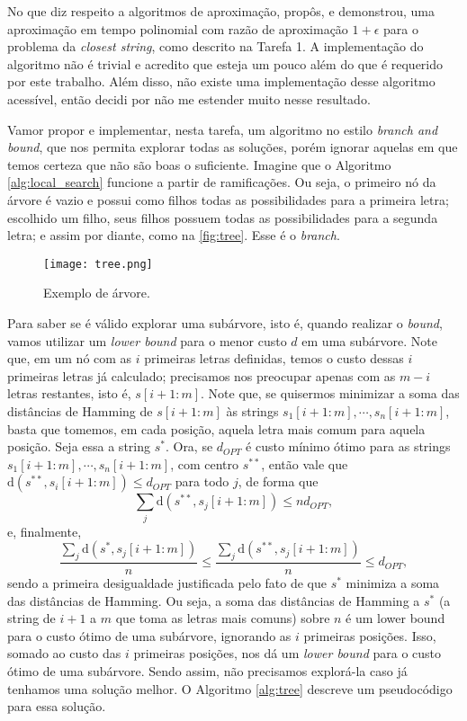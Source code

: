 No que diz respeito a algoritmos de aproximação, \cite{li2002closest} propôs, e demonstrou, uma aproximação em tempo polinomial com razão de aproximação $1 + \epsilon$ para o problema da \textit{closest string}, como descrito na Tarefa 1.
A implementação do algoritmo não é trivial e acredito que esteja um pouco além do que é requerido por este trabalho. Além disso, não existe uma implementação desse algoritmo acessível, então decidi por não me estender muito nesse resultado.

Vamor propor e implementar, nesta tarefa, um algoritmo no estilo \textit{branch and bound}, que nos permita explorar todas as soluções, porém ignorar aquelas em que temos certeza que não são boas o suficiente. Imagine que o Algoritmo \ref{alg:local_search} funcione a partir de ramificações. Ou seja, o primeiro nó da árvore é vazio e possui como filhos todas as possibilidades para a primeira letra; escolhido um filho, seus filhos possuem todas as possibilidades para a segunda letra; e assim por diante, como na \autoref{fig:tree}. Esse é o \textit{branch}.

\begin{figure}[H]
    \centering
    \texttt{[image: tree.png]}
    \caption{Exemplo de árvore.}
    \label{fig:tree}
\end{figure}

Para saber se é válido explorar uma subárvore, isto é, quando realizar o \textit{bound}, vamos utilizar um \textit{lower bound} para o menor custo $d$ em uma subárvore. Note que, em um nó com as $i$ primeiras letras definidas, temos o custo dessas $i$ primeiras letras já calculado; precisamos nos preocupar apenas com as $m-i$ letras restantes, isto é, $s[i+1:m]$. Note que, se quisermos minimizar a soma das distâncias de Hamming de $s[i+1:m]$ às strings $s_1[i+1:m], \cdots, s_n[i+1:m]$, basta que tomemos, em cada posição, aquela letra mais comum para aquela posição. Seja essa a string $s^\ast$. Ora, se $d_{OPT}$ é custo mínimo ótimo para as strings $s_1[i+1:m], \cdots, s_n[i+1:m]$, com centro $s^{\ast\ast}$, então vale que $\text{d}(s^{\ast\ast}, s_i[i+1:m]) \le d_{OPT}$ para todo $j$, de forma que
\[\sum_j \text{d}(s^{\ast\ast}, s_j[i+1:m]) \le n d_{OPT},\]
e, finalmente,
\[\frac{\sum_j \text{d}(s^{\ast}, s_j[i+1:m])}{n} \le \frac{\sum_j \text{d}(s^{\ast\ast}, s_j[i+1:m])}{n} \le d_{OPT},\]
sendo a primeira desigualdade justificada pelo fato de que $s^\ast$ minimiza a soma das distâncias de Hamming.
Ou seja, a soma das distâncias de Hamming a $s^\ast$ (a string de $i+1$ a $m$ que toma as letras mais comuns) sobre $n$ é um lower bound para o custo ótimo de uma subárvore, ignorando as $i$ primeiras posições. Isso, somado ao custo das $i$ primeiras posições, nos dá um \textit{lower bound} para o custo ótimo de uma subárvore. Sendo assim, não precisamos explorá-la caso já tenhamos uma solução melhor.
O Algoritmo \ref{alg:tree} descreve um pseudocódigo para essa solução.

